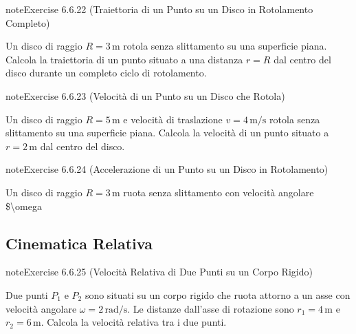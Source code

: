 \documentclass[letterpaper,10pt,italian]{jupyterBook}
\begin{document}
\begin{sphinxadmonition}{note}{Exercise 6.6.22 (Traiettoria di un Punto su un Disco in Rotolamento Completo)}



\sphinxAtStartPar
Un disco di raggio \(R = 3 \, \text{m}\) rotola senza slittamento su una superficie piana. Calcola la traiettoria di un punto situato a una distanza \(r = R\) dal centro del disco durante un completo ciclo di rotolamento.
\end{sphinxadmonition}
 \label{exercise:ch/mechanics/kinematics-problems-exercise-22}

\begin{sphinxadmonition}{note}{Exercise 6.6.23 (Velocità di un Punto su un Disco che Rotola)}



\sphinxAtStartPar
Un disco di raggio \(R = 5 \, \text{m}\) e velocità di traslazione \(v = 4 \, \text{m/s}\) rotola senza slittamento su una superficie piana. Calcola la velocità di un punto situato a \(r = 2 \, \text{m}\) dal centro del disco.
\end{sphinxadmonition}
 \label{exercise:ch/mechanics/kinematics-problems-exercise-23}

\begin{sphinxadmonition}{note}{Exercise 6.6.24 (Accelerazione di un Punto su un Disco in Rotolamento)}



\sphinxAtStartPar
Un disco di raggio \(R = 3 \, \text{m}\) ruota senza slittamento con velocità angolare \$\textbackslash{}omega
\end{sphinxadmonition}


\subsection{Cinematica Relativa}
\label{\detokenize{ch/mechanics/kinematics-problems:cinematica-relativa}} \label{exercise:ch/mechanics/kinematics-problems-exercise-24}

\begin{sphinxadmonition}{note}{Exercise 6.6.25 (Velocità Relativa di Due Punti su un Corpo Rigido)}



\sphinxAtStartPar
Due punti \(P_1\) e \(P_2\) sono situati su un corpo rigido che ruota attorno a un asse con velocità angolare \(\omega = 2 \, \text{rad/s}\). Le distanze dall’asse di rotazione sono \(r_1 = 4 \, \text{m}\) e \(r_2 = 6 \, \text{m}\). Calcola la velocità relativa tra i due punti.
\end{sphinxadmonition}
 \label{exercise:ch/mechanics/kinematics-problems-exercise-25}
\end{document}
